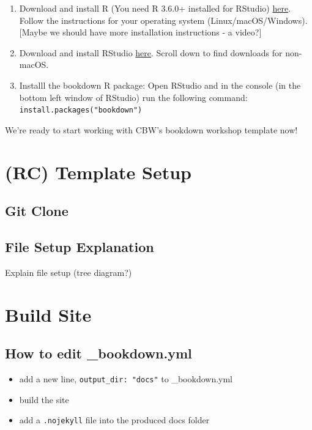 \documentclass[
]{book}
\providecommand{\tightlist}{%
  \setlength{\itemsep}{0pt}\setlength{\parskip}{0pt}}
\theoremstyle{definition}
\theoremstyle{definition}
\theoremstyle{definition}
\theoremstyle{definition}
\theoremstyle{remark}
\begin{document}
\begin{enumerate}
\def\labelenumi{\arabic{enumi}.}
\item
  Download and install R (You need R 3.6.0+ installed for RStudio) \href{https://cran.rstudio.com/}{here}. Follow the instructions for your operating system (Linux/macOS/Windows).
  {[}Maybe we should have more installation instructions - a video?{]}
\item
  Download and install RStudio \href{https://posit.co/download/rstudio-desktop/\#:~:text=AND\%20INSTALL\%20R-,2\%3A\%20Install\%20RStudio,-DOWNLOAD\%20RSTUDIO\%20DESKTOP}{here}. Scroll down to find downloads for non-macOS.
\item
  Installl the bookdown R package: Open RStudio and in the console (in the bottom left window of RStudio) run the following command: \texttt{install.packages("bookdown")}
\end{enumerate}

We're ready to start working with CBW's bookdown workshop template now!

\chapter{(RC) Template Setup}\label{rc-template-setup}

\section{Git Clone}\label{git-clone}

\section{File Setup Explanation}\label{file-setup-explanation}

Explain file setup (tree diagram?)

\chapter{Build Site}\label{build-site}

\section{How to edit \_bookdown.yml}\label{how-to-edit-_bookdown.yml}

\begin{itemize}
\tightlist
\item
  add a new line, \texttt{output\_dir:\ "docs"} to \_bookdown.yml
\item
  build the site
\item
  add a \texttt{.nojekyll} file into the produced docs folder
\end{itemize}
\end{document}
